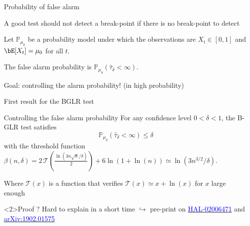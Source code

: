 \documentclass[11pt,english,ignorenonframetext,]{beamer}
\begin{document}
\begin{frame}{Probability of false alarm}

  A good test should not detect a break-point if there is no break-point to detect

  \begin{block}
    Let $\mathbb{P}_{\mu_0}$ be a probability model under which the observations are $X_t \in[0,1]$
    and $\bE[X_t] = \mu_0$ for all $t$.

    The \alert{false alarm probability} is $\mathbb{P}_{\mu_0}(\widehat{\tau}_\delta < \infty)$.
  \end{block}

  \alert{Goal: controlling the alarm probability!} (in high probability)

\end{frame}

\begin{frame}{First result for the BGLR test}

  \begin{block}{Controlling the false alarm probability}
    For any confidence level $0<\delta<1$,
    the B-GLR test satisfies
    \[ \mathbb{P}_{\mu_0}(\widehat{\tau}_\delta < \infty) \leq \delta \]
    with the threshold function
    $\beta(n,\delta)= 2\,\mathcal{T}(\frac{\ln(3n\sqrt{n}/\delta)}{2}) + 6\ln(1+\ln(n)) \simeq \ln(3n^{3/2}/\delta)$.
  \end{block}

  Where $\mathcal{T}(x)$ is a function that verifies $\mathcal{T}(x)\simeq x + \ln(x)$ for $x$ large enough

  \begin{exampleblock}<2>{Proof ?}
    Hard to explain in a short time
    $\hookrightarrow$ pre-print on
    \href{https://hal.inria.fr/hal-02006471}{\textcolor{blue}{HAL-02006471}}
    and
    \href{https://arxiv.org/abs/1902.01575}{\textcolor{blue}{arXiv:1902.01575}}
  \end{exampleblock}

\end{frame}
\end{document}
